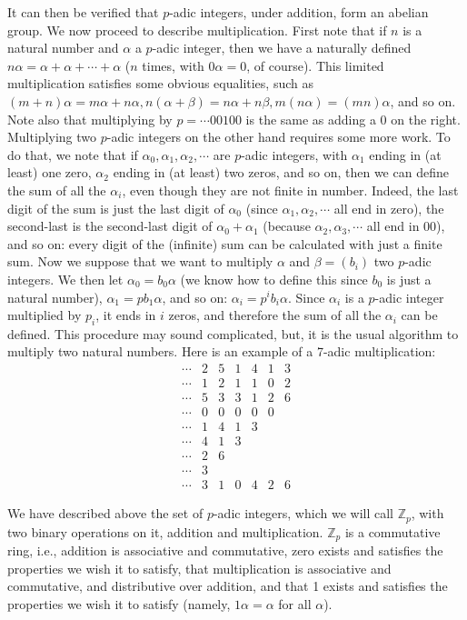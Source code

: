 \documentclass{llncs}
\begin{document}
It can then be verified that $p$-adic integers, under addition, form an abelian
group.
We now proceed to describe multiplication. First note that if $n$ is a natural
number and $\alpha $ a $p$-adic integer, then we have a naturally defined $n\alpha  = \alpha +\alpha + \cdots +\alpha $
($n$ times, with $0\alpha  = 0$, of course).  This limited multiplication satisfies some obvious equalities, such as
$(m + n)\alpha = m\alpha  + n\alpha , n(\alpha  + \beta) = n\alpha  + n\beta , m(n\alpha ) = (mn)\alpha $, and so on. 
Note also that multiplying by $p = \cdots 00100$ is the same as adding a $0$
on the right.
Multiplying two $p$-adic integers on the other hand requires some more work.
To do that, we note that if $\alpha _0, \alpha _1, \alpha _2, \cdots $  are $p$-adic integers, with $\alpha _1$ ending in (at
least) one zero, $\alpha _2$ ending in (at least) two zeros, and so on, then we can define
the sum of all the $\alpha _i$, even though they are not finite in number. Indeed, the last
digit of the sum is just the last digit of $\alpha _0$ (since $\alpha _1, \alpha _2, \cdots $ all end in zero), the
second-last is the second-last digit of $\alpha _0 + \alpha _1$ (because $\alpha _2, \alpha _3, \cdots $ all end in 00),
and so on: every digit of the (infinite) sum can be calculated with just a finite sum.
Now we suppose that we want to multiply $\alpha $ and $\beta  = (b_i)$ two $p$-adic integers. We
then let $\alpha _0 = b_0\alpha $ (we know how to define this since $b_0$ is just a natural number),
$\alpha _1 = pb_1\alpha $, and so on: $\alpha _i = p^ib_i\alpha $. Since $\alpha _i$ is a $p$-adic integer multiplied by $p_i$, it
ends in $i$ zeros, and therefore the sum of all the $\alpha _i$ can be defined.
This procedure may sound complicated, but,  it is the usual algorithm
 to multiply two natural numbers. Here
is an example of a 7-adic multiplication:
$$
\begin{array}{rrrrrrrr|}
\cdots &2&5&1&4&1&3\\
\cdots & 1& 2 &1& 1 & 0& 2\\
\hline
\cdots &5& 3& 3& 1& 2 & 6 \\
\cdots &0&0& 0&0&0& \\
\cdots &1&4&1&3&&\\
\cdots &4&1&3&&&\\
\cdots &2&6&&&&\\
\cdots &3&&&&&\\
\hline
\cdots &3&1&0&4&2&6
\end{array}
$$

We  have described above the set of $p$-adic integers, which we will call $\mathbb{Z}_p$, with two binary
operations on it, addition and multiplication. $\mathbb{Z}_p$ is a commutative ring, i.e., 
addition is associative and commutative,  zero exists
and satisfies the properties we wish it to satisfy, that multiplication is associative
and commutative, and distributive over addition, and that 1 exists and satisfies the
properties we wish it to satisfy (namely, $1\alpha  = \alpha $   for all    $\alpha $).
\end{document}
